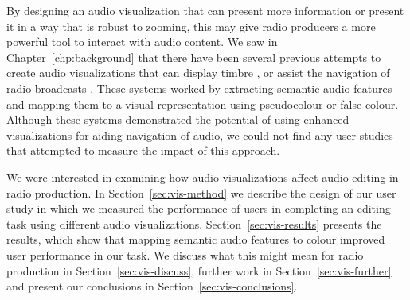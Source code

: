 


By designing an audio visualization that can present more information or present it in a way that is robust to zooming,
this may give radio producers a more powerful tool to interact with audio content. We saw in
Chapter~\ref{chp:background} that there have been several previous attempts to create audio visualizations that can
display timbre \citep{Tzanetakis2000,Rice2005}, or assist the navigation of radio broadcasts \citep{Mason2007}.  These
systems worked by extracting semantic audio features and mapping them to a visual representation using pseudocolour or
false colour. Although these systems demonstrated the potential of using enhanced visualizations for aiding navigation
of audio, we could not find any user studies that attempted to measure the impact of this approach.

We were interested in examining how audio visualizations affect audio editing in radio production. In
Section~\ref{sec:vis-method} we describe the design of our user study in which we measured the performance of users in
completing an editing task using different audio visualizations. Section~\ref{sec:vis-results} presents the results,
which show that mapping semantic audio features to colour improved user performance in our task. We discuss what this
might mean for radio production in Section~\ref{sec:vis-discuss}, further work in Section~\ref{sec:vis-further} and
present our conclusions in Section~\ref{sec:vis-conclusions}.


